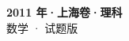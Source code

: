 \documentclass[zihao=-4, a4paper]{ctexart}
\begin{document}
\begin{center}
  {\Large\bfseries 2011 年·上海卷·理科}\\[4pt]
  {\large 数学 · 试题版}
\end{center}
\medskip
{}

\end{document}
